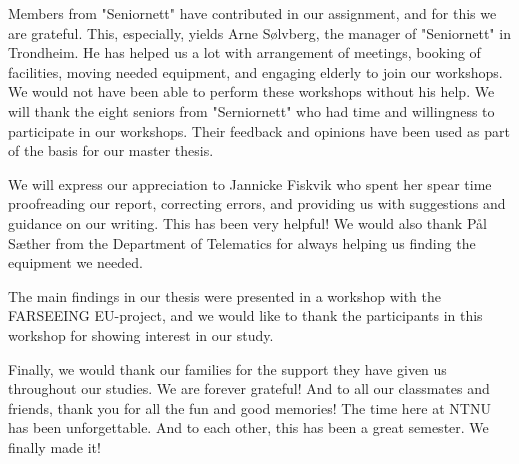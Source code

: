 \documentclass[b5paper,twoside,openright,11pt]{report}
\begin{document}
Members from "Seniornett" have contributed in our assignment, and for this we are grateful. This, especially, yields Arne Sølvberg, the manager of "Seniornett" in Trondheim. He has helped us a lot with arrangement of meetings, booking of facilities, moving needed equipment, and engaging elderly to join our workshops. We would not have been able to perform these workshops without his help. We will thank the eight seniors from "Serniornett" who had time and willingness to participate in our workshops. Their feedback and opinions have been used as part of the basis for our master thesis. 

We will express our appreciation to Jannicke Fiskvik who spent her spear time proofreading our report, correcting errors, and providing us with suggestions and guidance on our writing. This has been very helpful! We would also thank Pål Sæther from the Department of Telematics for always helping us finding the equipment we needed. 

The main findings in our thesis were presented in a workshop with the FARSEEING EU-project, and we would like to thank the participants in this workshop for showing interest in our study. 

Finally, we would thank our families for the support they have given us throughout our studies. We are forever grateful! And to all our classmates and friends, thank you for all the fun and good memories! The time here at NTNU has been unforgettable. And to each other, this has been a great semester. We finally made it!   

\cleardoublepage
{}
\tableofcontents
\cleardoublepage

\cleardoublepage
\listoffigures
\cleardoublepage
\listoftables
\cleardoublepage
{}
\pagestyle{fancy}
\fancyhead[LE]{\thepage}
\fancyhead[RE]{\leftmark}
\fancyhead[RO]{\thepage}
\fancyhead[LO]{\rightmark}
\fancyfoot{}
\cleardoublepage

\cleardoublepage

\cleardoublepage

\cleardoublepage

\cleardoublepage

\cleardoublepage

\cleardoublepage

\cleardoublepage

\cleardoublepage

\cleardoublepage

\cleardoublepage

\cleardoublepage

\cleardoublepage

\cleardoublepage


\pagestyle{plain}
\cleardoublepage
\appendix 
  
\cleardoublepage
\end{document}

